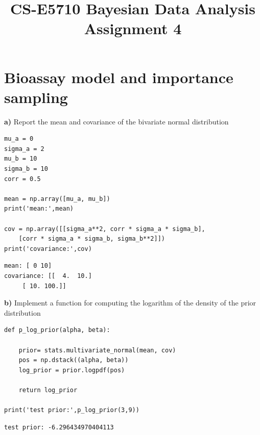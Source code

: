 \documentclass{article}
\begin{document}
\title{CS-E5710 Bayesian Data Analysis\\Assignment 4 }                  
\maketitle



\section{Bioassay model and importance sampling}
\textbf{a)} Report the mean and covariance of the bivariate normal distribution
\begin{verbatim}  
mu_a = 0
sigma_a = 2
mu_b = 10
sigma_b = 10
corr = 0.5

mean = np.array([mu_a, mu_b])
print('mean:',mean)

cov = np.array([[sigma_a**2, corr * sigma_a * sigma_b], 
	[corr * sigma_a * sigma_b, sigma_b**2]])
print('covariance:',cov)
\end{verbatim}

\begin{verbatim}
mean: [ 0 10]  
covariance: [[  4.  10.]
	 [ 10. 100.]]
\end{verbatim}
 
 
\textbf{b)} Implement a function for computing the logarithm of the density of the prior distribution
\begin{verbatim}  
def p_log_prior(alpha, beta):

    prior= stats.multivariate_normal(mean, cov)
    pos = np.dstack((alpha, beta))
    log_prior = prior.logpdf(pos)

    return log_prior
    
print('test prior:',p_log_prior(3,9))
\end{verbatim}

\begin{verbatim}
test prior: -6.296434970404113
\end{verbatim}
\end{document}
